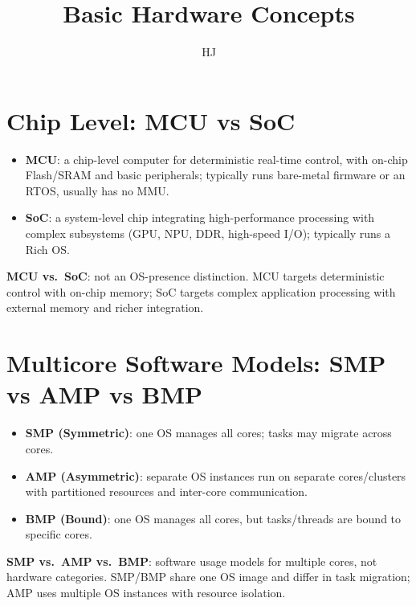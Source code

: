 \documentclass{article}
\title{Basic Hardware Concepts}
\author{HJ}
\makeatletter
\renewcommand{\maketitle}{%
    \begin{center}
        {\Large\bfseries \@title\par}\vspace{0.3em}
        {\normalsize \@author\par}\vspace{0.2em}
        {\small \@date\par}
    \end{center}\vspace{0.4em}
}
\makeatother
\begin{document}
\maketitle
\section{Chip Level: MCU vs SoC}
\begin{itemize}
    \item \textbf{MCU}: a chip-level computer for deterministic real-time control, with on-chip Flash/SRAM and basic peripherals; typically runs bare-metal firmware or an RTOS, usually has no MMU.
    \item \textbf{SoC}: a system-level chip integrating high-performance processing with complex subsystems (GPU, NPU, DDR, high-speed I/O); typically runs a Rich OS.
\end{itemize}

\textbf{MCU vs.\ SoC}: not an OS-presence distinction. MCU targets deterministic control with on-chip memory; SoC targets complex application processing with external memory and richer integration.

\section{Multicore Software Models: SMP vs AMP vs BMP}
\begin{itemize}
    \item \textbf{SMP (Symmetric)}: one OS manages all cores; tasks may migrate across cores.
    \item \textbf{AMP (Asymmetric)}: separate OS instances run on separate cores/clusters with partitioned resources and inter-core communication.
    \item \textbf{BMP (Bound)}: one OS manages all cores, but tasks/threads are bound to specific cores.
\end{itemize}

\textbf{SMP vs.\ AMP vs.\ BMP}: software usage models for multiple cores, not hardware categories. SMP/BMP share one OS image and differ in task migration; AMP uses multiple OS instances with resource isolation.
\end{document}
